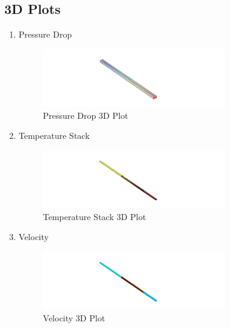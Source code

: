         \subsection{3D Plots}
            \begin{enumerate}
                \item Pressure Drop
                    \begin{figure}[H]
                        \centering
                        \includegraphics[width=0.75\textwidth]{00_Images/00_Pressure.png}
                        \caption{Pressure Drop 3D Plot}
                    \end{figure}
                \item Temperature Stack
                    \begin{figure}[H]
                        \centering
                        \includegraphics[width=0.75\textwidth]{00_Images/00_Temperature.png}
                        \caption{Temperature Stack 3D Plot}
                    \end{figure}
                \item Velocity 
                    \begin{figure}
                        \centering
                        \includegraphics[width=0.75\textwidth]{00_Images/00_Velocity.png}
                        \caption{Velocity 3D Plot}
                    \end{figure}
            \end{enumerate}